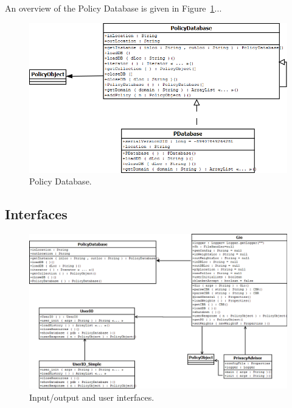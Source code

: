 An overview of the Policy Database is given in Figure~\ref{pd_fig}...



\begin{figure}[htbp]
\begin{center}
\includegraphics[width = \textwidth]{DesignReport/uml/pd.png}
\caption{Policy Database.}
\label{pd_fig}
\end{center}
\end{figure}

\subsection{Interfaces}

      



\begin{figure}[htbp]
\begin{center}
\includegraphics[width = \textwidth]{DesignReport/uml/gio.png}
\caption{Input/output and user interfaces.}
\label{UserIO}
\end{center}
\end{figure}


